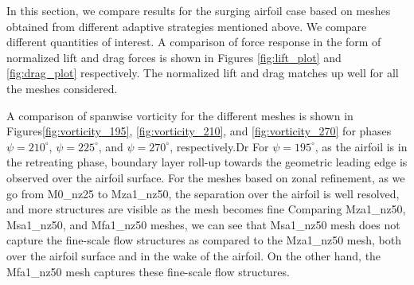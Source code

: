 In this section, we compare results for the surging airfoil case based on meshes obtained from different adaptive strategies mentioned above. 
We compare different quantities of interest. 
A comparison of force response in the form of normalized lift and drag forces is shown in Figures \ref{fig:lift_plot} and \ref{fig:drag_plot} respectively. The normalized lift and drag matches up well for all the meshes considered.

A comparison of spanwise vorticity for the different meshes is shown in Figures\ref{fig:vorticity_195}, \ref{fig:vorticity_210}, and \ref{fig:vorticity_270} for phases $\psi=210^\circ$, $\psi=225^\circ$, and $\psi=270^\circ$, respectively.Dr
For $\psi=195^\circ$, as the airfoil is in the retreating phase, boundary layer roll-up towards the geometric leading edge is observed over the airfoil surface.
For the meshes based on zonal refinement, as we go from M0\_nz25 to Mza1\_nz50, the separation over the airfoil is well resolved, and more structures are visible as the mesh becomes fine
Comparing Mza1\_nz50, Msa1\_nz50, and Mfa1\_nz50 meshes, we can see that Msa1\_nz50 mesh does not capture the fine-scale flow structures as compared to the Mza1\_nz50 mesh, both over the airfoil surface and in the wake of the airfoil. 
On the other hand, the Mfa1\_nz50 mesh captures these fine-scale flow structures.

